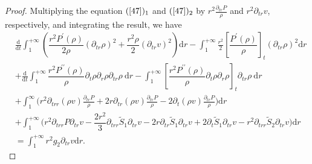 \documentclass[10pt,reqno]{amsart}
\numberwithin{equation}{section}
\begin{document}
\begin{proof}
		Multiplying the equation $(\ref{47})_1$ and $(\ref{47})_2$ 
		by  $r^2\frac{\partial_{tr}P}{\rho}$ and $r^2\partial_{tr}v$, respectively, and  integrating the result, we have
		\begin{equation}\label{48}
			\begin{aligned}
				&\frac{\mathrm{d}}{\mathrm{d} t}\int_{1}^{+\infty}\left(\dfrac{r^2 P^{\prime}(\rho)}{2\rho} \left(\partial_{tr} \rho\right)^2+\dfrac{r^2\rho}{2} (\partial_{tr}v)^2\right)\mathrm{d}r
				-\int_{1}^{+\infty}\frac{r^2}{2}[\dfrac{ P^{\prime}(\rho)}{\rho}]_t\left(\partial_{tr} \rho\right)^2\mathrm{d}r\\
				&+\frac{\mathrm{d}}{\mathrm{d} t}\int_{1}^{+\infty} \dfrac{r^2 P^{\prime\prime}(\rho)}{\rho} \partial_{t}\rho\partial_{r}\rho\partial_{tr}\rho\mathrm{~d}r
				-\int_{1}^{+\infty} [\dfrac{r^2 P^{\prime\prime}(\rho)}{\rho} \partial_{t}\rho\partial_{r}\rho]_t\partial_{tr}\rho\mathrm{~d}r\\
				&+\int_{1}^{\infty}\bigg(r^2\partial_{trr}\left(\rho v\right) \frac{\partial_{tr}P}{\rho}
				+2r \partial_{tr} (\rho v) \frac{\partial_{tr}P}{\rho}
				-2\partial_{t} (\rho v) \frac{\partial_{tr}P}{\rho}\bigg)\mathrm{d}r\\
				&+\int_{1}^{+\infty}\bigg(
				r^2 \partial_{trr}P \partial_{tr}v-\dfrac{2 r^2}{3} \partial_{trr} \tilde{S}_1\partial_{tr}v-2r \partial_{tr}\tilde{S}_1 \partial_{tr}v+2\partial_{t}\tilde{S}_1\partial_{tr}v
				-r^2\partial_{trr}\tilde{S}_2\partial_{tr}v\bigg)\mathrm{d}r\\
				&=\int_{1}^{+\infty}r^2g_2 \partial_{tr}v\mathrm{d}r.
			\end{aligned}
		\end{equation} 
		

\end{proof}
\end{document}
